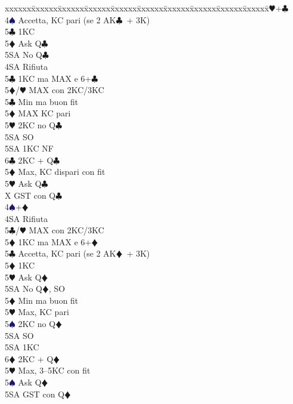 \documentclass[a4paper,italian]{article}
\newcommand{\BC}{\textcolor{OliveGreen}{$\clubsuit$}}
\newcommand{\BD}{\textcolor{RedOrange}{$\vardiamondsuit$}}
\newcommand{\BH}{\textcolor{Red2}{$\varheartsuit${}}}
\newcommand{\BS}{\textcolor{MidnightBlue}{$\spadesuit${}}}
\newenvironment{bidtable}
{\begin{tabbing}

    xxxxxx\=xxxxxx\=xxxxxx\=xxxxxx\=xxxxxx\=xxxxxx\=xxxxxx\=xxxxxx\=xxxxxx\=xxxxxx\=\kill}
{\end{tabbing} }%
\newenvironment{sviluppi}
{\begin{tcolorbox}[colframe=azzurro,title=Sviluppi particolari]}
    {
\end{tcolorbox} }%
\begin{document}
\begin{multicols}{2}
\begin{sviluppi}
        \begin{bidtable}
        4\BH {}+\BC\+\\
        4\BS \> Accetta, KC pari (se 2 AK\BC\ + 3K)\+\\
        5\BC \> 1KC\\
        5\BD \> Ask Q\BC\+\\
        5SA\> No Q\BC\-\-\\
        4SA \> Rifiuta \+\\
        5\BC \> 1KC ma MAX e 6+\BC\\
        5\BD/\BH \> MAX con 2KC/3KC \-\\
        5\BC \> Min ma buon fit\+\\
        5\BD \> MAX KC pari\+\\
        5\BH \> 2KC no Q\BC\+\\
        5SA \> SO\-\\
        5SA \> 1KC NF\\
        6\BC \> 2KC + Q\BC\-\-\\
        5\BD \> Max, KC dispari con fit\+\\
        5\BH \> Ask Q\BC\\
        X \> GST con Q\BC\-\-\\
        4\BS {}+\BD\+\\
        4SA \> Rifiuta \+\\
        5\BC/\BH \> MAX con 2KC/3KC\\
        5\BD \> 1KC ma MAX e 6+\BD\-\\
        5\BC \> Accetta, KC pari (se 2 AK\BD\ + 3K)\+\\
        5\BD \> 1KC \\
        5\BH \> Ask Q\BD\+\\
        5SA \> No Q\BD, SO\-\-\\
        5\BD \> Min ma buon fit\+\\
        5\BH \> Max, KC pari \+\\
        5\BS \> 2KC no Q\BD\+\\
        5SA \> SO\-\\
        5SA \> 1KC \\
        6\BD \> 2KC + Q\BD\-\-\\
        5\BH \> Max, 3--5KC con fit\+\\
        5\BS \> Ask Q\BD\\
        5SA \> GST con Q\BD
        \end{bidtable}
    \end{sviluppi}
    \vfill\null
    \columnbreak


\end{multicols}
\end{document}
